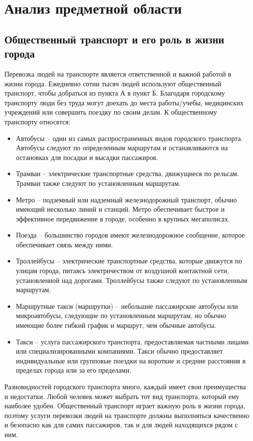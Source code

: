 \section{Анализ предметной области}
\subsection{Общественный транспорт и его роль в жизни города}

Перевозка людей на транспорте является ответственной и важной работой в жизни города. Ежедневно сотни тысяч людей используют общественный транспорт, чтобы добраться из пункта А в пункт Б. Благодаря городскому транспорту люди без труда могут доехать до места работы/учебы, медицинских учреждений или совершить поездку по своим делам. К общественному транспорту относятся:
\begin{itemize}
	\item Автобусы -- один из самых распространенных видов городского транспорта. Автобусы следуют по определенным маршрутам и останавливаются на остановках для посадки и высадки пассажиров.
	\item Трамваи -- электрические транспортные средства, движущиеся по рельсам. Трамваи также следуют по установленным маршрутам.
	\item Метро -- подземный или надземный железнодорожный транспорт, обычно имеющий несколько линий и станций. Метро обеспечивает быстрое и эффективное передвижение в городе, особенно в крупных мегаполисах.
	\item Поезда -- большинство городов имеют железнодорожное сообщение, которое обеспечивает связь между ними.
	\item Троллейбусы -- электрические транспортные средства, которые движутся по улицам города, питаясь электричеством от воздушной контактной сети, установленной над дорогами. Троллейбусы также следуют по установленным маршрутам.
	\item Маршрутные такси (маршрутки) -- небольшие пассажирские автобусы или микроавтобусы, следующие по установленным маршрутам, но обычно имеющие более гибкий график и маршрут, чем обычные автобусы.
	\item Такси -- услуга пассажирского транспорта, предоставляемая частными лицами или специализированными компаниями. Такси обычно предоставляет индивидуальные или групповые поездки на короткие и средние расстояния в пределах города или за его пределами.
\end{itemize}

 Разновидностей городского транспорта много, каждый имеет свои преимущества и недостатки. Любой человек может выбрать тот вид транспорта, который ему наиболее удобен. Общественный транспорт играет важную роль в жизни города, поэтому услуги перевозки людей на транспорте должны выполняться качественно и безопасно как для самих пассажиров, так и для людей находящихся рядом с ним.


